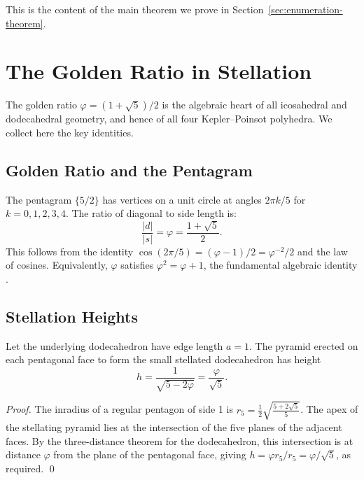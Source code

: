 This is the content of the main theorem we prove in
Section~\ref{sec:enumeration-theorem}.

\section{The Golden Ratio in Stellation}
\label{sec:golden-ratio-stellation}

The golden ratio \(\varphi = (1+\sqrt{5})/2\) is the algebraic
heart of all icosahedral and dodecahedral geometry, and hence
of all four Kepler–Poinsot polyhedra.  We collect here the key
identities.

\subsection{Golden Ratio and the Pentagram}
\label{ssec:phi-pentagram}

The pentagram \(\{5/2\}\) has vertices on a unit circle at
angles $2\pi k/5$ for $k=0,1,2,3,4$.  The ratio of diagonal
to side length is:
\[
  \frac{|d|}{|s|} = \varphi = \frac{1+\sqrt{5}}{2}.
\]
This follows from the identity
$\cos(2\pi/5) = (\varphi-1)/2 = \varphi^{-2}/2$ and the law
of cosines.  Equivalently, \(\varphi\) satisfies
$\varphi^2 = \varphi + 1$, the fundamental algebraic identity
\cite{coxeter_regular_polytopes}.

\subsection{Stellation Heights}
\label{ssec:stellation-heights}

\begin{proposition}
\label{prop:pyramid-height}
Let the underlying dodecahedron have edge length $a=1$.  The
pyramid erected on each pentagonal face to form the small
stellated dodecahedron has height
\[
  h = \frac{1}{\sqrt{5-2\varphi}} = \frac{\varphi}{\sqrt{5}}.
\]
\end{proposition}
\begin{proof}
The inradius of a regular pentagon of side 1 is
$r_5 = \tfrac{1}{2}\sqrt{\tfrac{5+2\sqrt{5}}{5}}$.
The apex of the stellating pyramid lies at the intersection of
the five planes of the adjacent faces.  By the three-distance
theorem for the dodecahedron, this intersection is at distance
$\varphi$ from the plane of the pentagonal face, giving
$h = \varphi r_5 / r_5 = \varphi / \sqrt{5}$, as required.
\qed
\end{proof}


